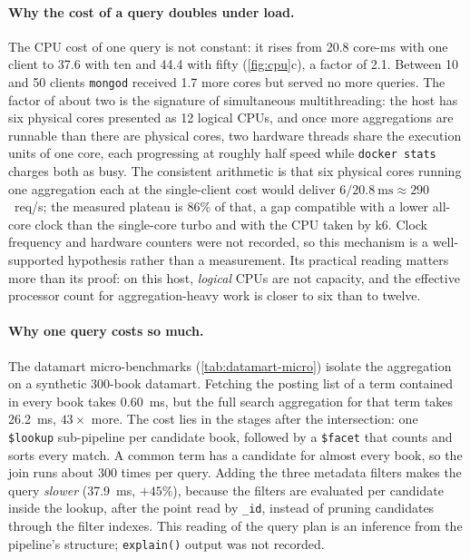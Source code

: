 \documentclass[10pt,a4paper]{article}
\newcommand{\code}[1]{\texttt{#1}}
\begin{document}
\paragraph{Why the cost of a query doubles under load.}
The CPU cost of one query is not constant: it rises from 20.8 core-ms with one
client to 37.6 with ten and 44.4 with fifty (\cref{fig:cpu}c), a factor of 2.1.
Between 10 and 50 clients \code{mongod} received 1.7 more cores but served no
more queries. The factor of about two is the signature of simultaneous
multithreading: the host has six physical cores presented as 12 logical CPUs,
and once more aggregations are runnable than there are physical cores, two
hardware threads share the execution units of one core, each progressing at
roughly half speed while \code{docker stats} charges both as busy. The
consistent arithmetic is that six physical cores running one aggregation each at
the single-client cost would deliver $6 / 20.8~\text{ms} \approx 290$~req/s; the
measured plateau is 86\% of that, a gap compatible with a lower all-core clock
than the single-core turbo and with the CPU taken by k6. Clock frequency and
hardware counters were not recorded, so this mechanism is a well-supported
hypothesis rather than a measurement. Its practical reading matters more than
its proof: on this host, \emph{logical} CPUs are not capacity, and the
effective processor count for aggregation-heavy work is closer to six than to
twelve.

\paragraph{Why one query costs so much.}
The datamart micro-benchmarks (\cref{tab:datamart-micro}) isolate the
aggregation on a synthetic 300-book datamart. Fetching the posting list of a
term contained in every book takes 0.60~ms, but the full search aggregation for
that term takes 26.2~ms, $43\times$ more. The cost lies in the stages after the
intersection: one \code{\$lookup} sub-pipeline per candidate book, followed by
a \code{\$facet} that counts and sorts every match. A common term has a
candidate for almost every book, so the join runs about 300 times per query.
Adding the three metadata filters makes the query \emph{slower} (37.9~ms,
$+45\%$), because the filters are evaluated per candidate inside the lookup,
after the point read by \code{\_id}, instead of pruning candidates through the
filter indexes. This reading of the query plan is an inference from the
pipeline's structure; \code{explain()} output was not recorded.
\end{document}
